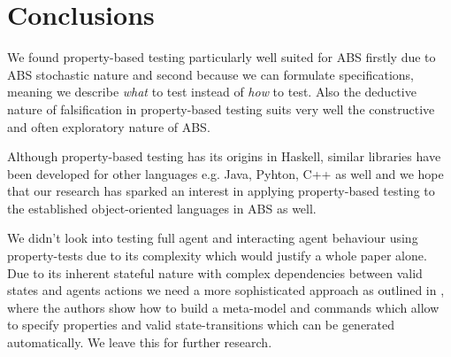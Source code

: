 \section{Conclusions}
\label{sec:conclusions}

We found property-based testing particularly well suited for ABS firstly due to ABS stochastic nature and second because we can formulate specifications, meaning we describe \textit{what} to test instead of \textit{how} to test. Also the deductive nature of falsification in property-based testing suits very well the constructive and often exploratory nature of ABS. 

Although property-based testing has its origins in Haskell, similar libraries have been developed for other languages e.g. Java, Pyhton, C++ as well and we hope that our research has sparked an interest in applying property-based testing to the established object-oriented languages in ABS as well.

We didn't look into testing full agent and interacting agent behaviour using property-tests due to its complexity which would justify a whole paper alone. Due to its inherent stateful nature with complex dependencies between valid states and agents actions we need a more sophisticated approach as outlined in \cite{de_vries_-depth_2019}, where the authors show how to build a meta-model and commands which allow to specify properties and valid state-transitions which can be generated automatically. We leave this for further research.